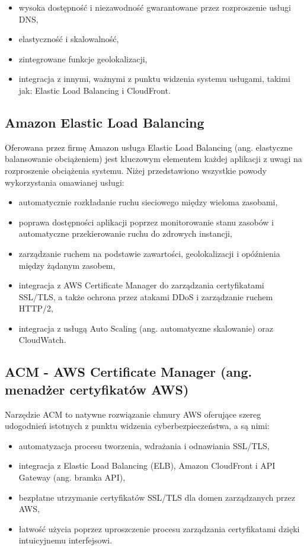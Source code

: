 \documentclass[12pt,twoside]{book}
\begin{document}
    \begin{itemize}
        \item wysoka dostępność i niezawodność gwarantowane przez rozproszenie usługi DNS,
        \item elastyczność i skalowalność,
        \item zintegrowane funkcje geolokalizacji,
        \item integracja z innymi, ważnymi z punktu widzenia systemu usługami, takimi jak: Elastic Load Balancing i CloudFront. \cite{aws.route53}
    \end{itemize}

    \subsection{Amazon Elastic Load Balancing}
    Oferowana przez firmę Amazon usługa Elastic Load Balancing (ang. elastyczne balansowanie obciążeniem) jest kluczowym elementem każdej aplikacji z uwagi na rozproszenie obciążenia systemu. Niżej przedstawiono wszystkie powody wykorzystania omawianej usługi:

    \begin{itemize}
        \item automatycznie rozkładanie ruchu sieciowego między wieloma zasobami,
        \item poprawa dostępności aplikacji poprzez monitorowanie stanu zasobów i automatyczne przekierowanie ruchu do zdrowych instancji,
        \item zarządzanie ruchem na podstawie zawartości, geolokalizacji i opóźnienia między żądanym zasobem,
        \item integracja z AWS Certificate Manager do zarządzania certyfikatami SSL/TLS, a także ochrona przez atakami DDoS i zarządzanie ruchem HTTP/2,
        \item integracja z usługą Auto Scaling (ang. automatyczne skalowanie) oraz CloudWatch. \cite{aws.elb}
    \end{itemize}

    \subsection{ACM - AWS Certificate Manager (ang. menadżer certyfikatów AWS)}
    Narzędzie ACM to natywne rozwiązanie chmury AWS oferujące szereg udogodnień istotnych z punktu widzenia cyberbezpieczeństwa, a są nimi:

    \begin{itemize}
        \item automatyzacja procesu tworzenia, wdrażania i odnawiania SSL/TLS,
        \item integracja z Elastic Load Balancing (ELB), Amazon CloudFront i API Gateway (ang. bramka API),
        \item bezpłatne utrzymanie certyfikatów SSL/TLS dla domen zarządzanych przez AWS,
        \item łatwość użycia poprzez uproszczenie procesu zarządzania certyfikatami dzięki intuicyjnemu interfejsowi. \cite{aws.acm}
    \end{itemize}
\end{document}

